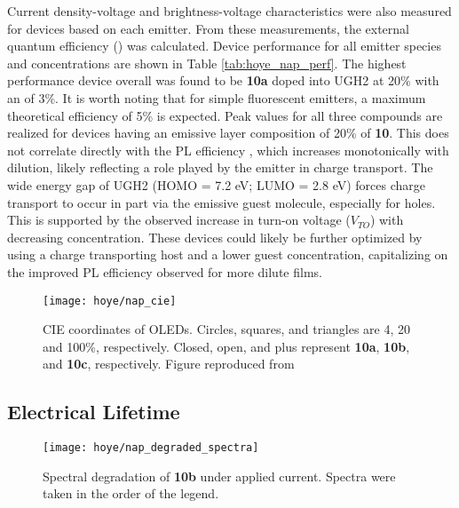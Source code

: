 \documentclass[../thesis.tex]{subfiles}
\begin{document}
Current density-voltage and brightness-voltage characteristics were also measured for devices based on each emitter. 
From these measurements, the external quantum efficiency (\eqe) was calculated. 
Device performance for all emitter species and concentrations are shown in Table \ref{tab:hoye_nap_perf}. 
The highest performance device overall was found to be \textbf{10a} doped into UGH2 at 20\% with an \eqe of 3\%. 
It is worth noting that for simple fluorescent emitters, a maximum theoretical efficiency of 5\% is expected.\supercite{Yang2004,Kim2015}
Peak \eqe values for all three compounds are realized for devices having an emissive layer composition of 20\% of \textbf{10}. 
This does not correlate directly with the PL efficiency \pl, which increases monotonically with dilution, likely reflecting a role played by the emitter in charge transport. 
The wide energy gap of UGH2 (HOMO = 7.2 eV; LUMO = 2.8 eV)\supercite{Ren2004} forces charge transport to occur in part via the emissive guest molecule, especially for holes. 
This is supported by the observed increase in turn-on voltage ($V_{TO}$) with decreasing concentration. 
These devices could likely be further optimized by using a charge transporting host and a lower guest concentration, capitalizing on the improved PL efficiency observed for more dilute films.
\begin{figure}[hb]
\centering
\texttt{[image: hoye/nap\_cie]}
\caption{CIE coordinates of OLEDs.  Circles, squares, and triangles are 4, 20 and 100\%, respectively. Closed, open, and plus represent \textbf{10a}, \textbf{10b}, and \textbf{10c}, respectively.  Figure reproduced from \textcite{Xu2016}}
\label{fig:hoye_cie}
\end{figure}

\subsection{Electrical Lifetime}

\begin{wrapfigure}{r}{.5\textwidth}
\centering
\texttt{[image: hoye/nap\_degraded\_spectra]}
\caption{Spectral degradation of \textbf{10b} under applied current. Spectra were taken in the order of the legend.}
\label{fig:hoye_nap_degraded_spectra}
\end{wrapfigure}
\end{document}
